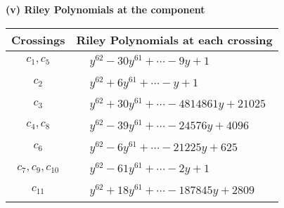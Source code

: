 \documentclass[1p]{elsarticle_modified}
\theoremstyle{definition}
\begin{document}
\newpage\renewcommand{\arraystretch}{1}
\flushleft \textbf{(v) Riley Polynomials at the component}\newline \\
\begin{tabular}{m{50pt}|m{274pt}}
Crossings & \hspace{64pt}Riley Polynomials at each crossing \\
\hline $$\begin{aligned}c_{1},c_{5}\end{aligned}$$&$\begin{aligned}
&y^{62}-30 y^{61}+\cdots-9 y+1
\end{aligned}$\\
\hline $$\begin{aligned}c_{2}\end{aligned}$$&$\begin{aligned}
&y^{62}+6 y^{61}+\cdots- y+1
\end{aligned}$\\
\hline $$\begin{aligned}c_{3}\end{aligned}$$&$\begin{aligned}
&y^{62}+30 y^{61}+\cdots-4814861 y+21025
\end{aligned}$\\
\hline $$\begin{aligned}c_{4},c_{8}\end{aligned}$$&$\begin{aligned}
&y^{62}-39 y^{61}+\cdots-24576 y+4096
\end{aligned}$\\
\hline $$\begin{aligned}c_{6}\end{aligned}$$&$\begin{aligned}
&y^{62}-6 y^{61}+\cdots-21225 y+625
\end{aligned}$\\
\hline $$\begin{aligned}c_{7},c_{9},c_{10}\end{aligned}$$&$\begin{aligned}
&y^{62}-61 y^{61}+\cdots-2 y+1
\end{aligned}$\\
\hline $$\begin{aligned}c_{11}\end{aligned}$$&$\begin{aligned}
&y^{62}+18 y^{61}+\cdots-187845 y+2809
\end{aligned}$\\
\hline
\end{tabular}\\~\\
\end{document}
